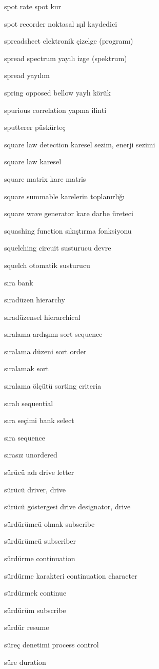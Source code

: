 \documentclass[12pt,fleqn]{article}\usepackage{../../common}
\begin{document}
spot rate spot kur

spot recorder noktasal ışıl kaydedici

spreadsheet elektronik çizelge (programı)

spread spectrum yayılı izge (spektrum)

spread yayılım

spring opposed bellow yaylı körük

spurious correlation yapma ilinti

sputterer püskürteç

square law detection karesel sezim, enerji sezimi

square law karesel

square matrix kare matris

square summable karelerin toplanırlığı

square wave generator kare darbe üreteci

squashing function sıkıştırma fonksiyonu

squelching circuit susturucu devre

squelch otomatik susturucu

sıra bank

sıradüzen hierarchy

sıradüzensel hierarchical

sıralama ardışımı sort sequence

sıralama düzeni sort order

sıralamak sort

sıralama ölçütü sorting criteria

sıralı sequential

sıra seçimi bank select

sıra sequence

sırasız unordered

sürücü adı drive letter

sürücü driver, drive

sürücü göstergesi drive designator, drive

sürdürümcü olmak subscribe

sürdürümcü subscriber

sürdürme continuation

sürdürme karakteri continuation character

sürdürmek continue

sürdürüm subscribe

sürdür resume

süreç denetimi process control

süre duration
\end{document}

